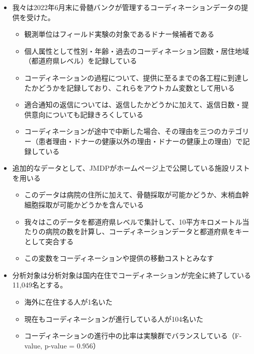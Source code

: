 \documentclass[
  a4paperpaper,
]{article}
\providecommand{\tightlist}{%
  \setlength{\itemsep}{0pt}\setlength{\parskip}{0pt}}\usepackage{longtable,booktabs,array}
\begin{document}
\begin{itemize}
\tightlist
\item
  我々は2022年6月末に骨髄バンクが管理するコーディネーションデータの提供を受けた。

  \begin{itemize}
  \tightlist
  \item
    観測単位はフィールド実験の対象であるドナー候補者である
  \item
    個人属性として性別・年齢・過去のコーディネーション回数・居住地域（都道府県レベル）を記録している
  \item
    コーディネーションの過程について、提供に至るまでの各工程に到達したかどうかを記録しており、これらをアウトカム変数として用いる
  \item
    適合通知の返信については、返信したかどうかに加えて、返信日数・提供意向についても記録きろくしている
  \item
    コーディネーションが途中で中断した場合、その理由を三つのカテゴリー（患者理由・ドナーの健康以外の理由・ドナーの健康上の理由）で記録している
  \end{itemize}
\item
  追加的なデータとして、JMDPがホームページ上で公開している施設リストを用いる

  \begin{itemize}
  \tightlist
  \item
    このデータは病院の住所に加えて、骨髄採取が可能かどうか、末梢血幹細胞採取が可能かどうかを含んでいる
  \item
    我々はこのデータを都道府県レベルで集計して、10平方キロメートル当たりの病院の数を計算し、コーディネーションデータと都道府県をキーとして突合する
  \item
    この変数をコーディネーションや提供の移動コストとみなす
  \end{itemize}
\item
  分析対象は分析対象は国内在住でコーディネーションが完全に終了している11,049名とする。

  \begin{itemize}
  \tightlist
  \item
    海外に在住する人が1名いた
  \item
    現在もコーディネーションが進行している人が104名いた
  \item
    コーディネーションの進行中の比率は実験群でバランスしている（F-value,
    p-value = \(0.956\)）
  \end{itemize}
\end{itemize}
\end{document}
